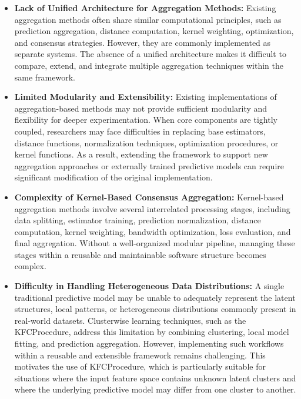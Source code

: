 \begin{itemize}        
    \item \textbf{Lack of Unified Architecture for Aggregation Methods:}
          Existing aggregation methods often share similar computational principles, such as prediction aggregation, distance computation, kernel weighting, optimization, and consensus strategies. However, they are commonly implemented as separate systems. The absence of a unified architecture makes it difficult to compare, extend, and integrate multiple aggregation techniques within the same framework.
          
          
    \item \textbf{Limited Modularity and Extensibility:} 
          Existing implementations of aggregation-based methods may not provide sufficient modularity and flexibility for deeper experimentation. When core components are tightly coupled, researchers may face difficulties in replacing base estimators, distance functions, normalization techniques, optimization procedures, or kernel functions. As a result, extending the framework to support new aggregation approaches or externally trained predictive models can require significant modification of the original implementation.
          
    \item \textbf{Complexity of Kernel-Based Consensus Aggregation:} 
          Kernel-based aggregation methods involve several interrelated processing stages, including data splitting, estimator training, prediction normalization, distance computation, kernel weighting, bandwidth optimization, loss evaluation, and final aggregation. Without a well-organized modular pipeline, managing these stages within a reusable and maintainable software structure becomes complex.
          
    \item \textbf{Difficulty in Handling Heterogeneous Data Distributions:} 
          A single traditional predictive model may be unable to adequately represent the latent structures, local patterns, or heterogeneous distributions commonly present in real-world datasets. Clusterwise learning techniques, such as the KFCProcedure, address this limitation by combining clustering, local model fitting, and prediction aggregation. However, implementing such workflows within a reusable and extensible framework remains challenging. This motivates the use of KFCProcedure, which is particularly suitable for situations where the input feature space contains unknown latent clusters and where the underlying predictive model may differ from one cluster to another.
          
\end{itemize}

